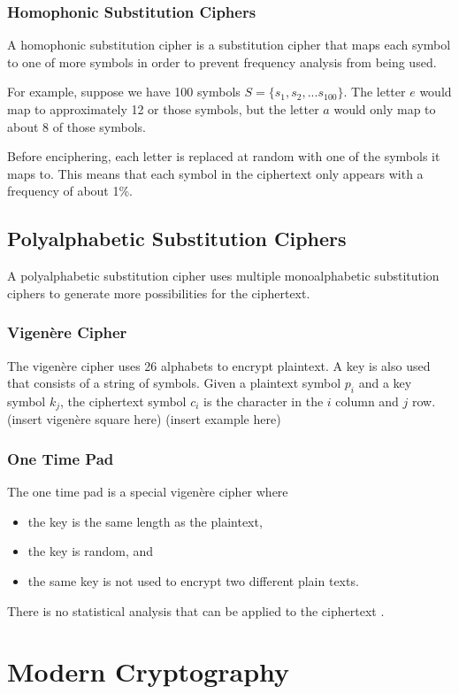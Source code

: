 \documentclass[12pt]{article}
\begin{document}
\subsubsection{Homophonic Substitution Ciphers}
A homophonic substitution cipher is a substitution cipher that maps each symbol to one of more symbols in order to prevent frequency analysis from being used. 

For example, suppose we have 100 symbols $S=\{s_1,s_2,...s_{100}\}$. The letter $e$ would map to approximately 12 or those symbols, but the letter $a$ would only map to about 8 of those symbols.

Before enciphering, each letter is replaced at random with one of the symbols it maps to. This means that each symbol in the ciphertext only appears with a frequency of about 1\%.

\subsection{Polyalphabetic Substitution Ciphers}
A polyalphabetic substitution cipher uses multiple monoalphabetic substitution ciphers to generate more possibilities for the ciphertext.

\subsubsection{Vigen\`{e}re Cipher}
The vigen\`{e}re cipher uses 26 alphabets to encrypt plaintext. A key is also used that consists of a string of symbols. Given a plaintext symbol $p_i$ and a key symbol $k_j$, the ciphertext symbol $c_i$ is the character in the $i$ column and $j$ row.
(insert vigen\`{e}re square here)
(insert example here)
\subsubsection{One Time Pad}
The one time pad is a special vigen\`{e}re cipher where
\begin{itemize}
	\item the key is the same length as the plaintext,
	\item the key is random, and
	\item the same key is not used to encrypt two different plain texts.
\end{itemize}
There is no statistical analysis that can be applied to the ciphertext \cite[pg. 393]{compsec}.
\section{Modern Cryptography}
\end{document}
